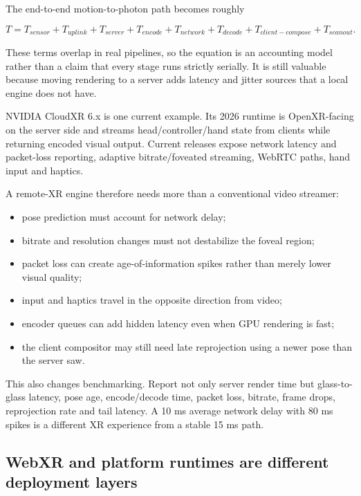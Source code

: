 The end-to-end motion-to-photon path becomes roughly

\[
T =
T_{sensor}
+T_{uplink}
+T_{server}
+T_{encode}
+T_{network}
+T_{decode}
+T_{client-compose}
+T_{scanout}.
\]

These terms overlap in real pipelines, so the equation is an accounting model rather than a claim that every stage runs strictly serially. It is still valuable because moving rendering to a server adds latency and jitter sources that a local engine does not have.

NVIDIA CloudXR 6.x is one current example. Its 2026 runtime is OpenXR-facing on the server side and streams head/controller/hand state from clients while returning encoded visual output. Current releases expose network latency and packet-loss reporting, adaptive bitrate/foveated streaming, WebRTC paths, hand input and haptics.

A remote-XR engine therefore needs more than a conventional video streamer:

\begin{itemize}
\tightlist
\item
  pose prediction must account for network delay;
\item
  bitrate and resolution changes must not destabilize the foveal region;
\item
  packet loss can create age-of-information spikes rather than merely lower visual quality;
\item
  input and haptics travel in the opposite direction from video;
\item
  encoder queues can add hidden latency even when GPU rendering is fast;
\item
  the client compositor may still need late reprojection using a newer pose than the server saw.
\end{itemize}

This also changes benchmarking. Report not only server render time but glass-to-glass latency, pose age, encode/decode time, packet loss, bitrate, frame drops, reprojection rate and tail latency. A 10 ms average network delay with 80 ms spikes is a different XR experience from a stable 15 ms path.

\subsection{WebXR and platform runtimes are different deployment layers}\label{webxr-and-platform-runtimes-are-different-deployment-layers}

